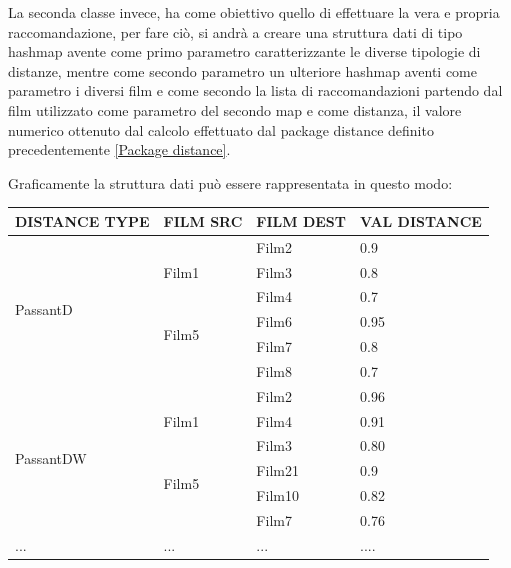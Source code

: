 La seconda classe invece, ha come obiettivo quello di effettuare la vera e propria raccomandazione, per fare ciò, si andrà a creare una struttura dati di tipo hashmap avente come primo parametro caratterizzante le diverse tipologie di distanze, mentre come secondo parametro un ulteriore hashmap aventi come parametro i diversi film e come secondo la lista di raccomandazioni partendo dal film utilizzato come parametro del secondo map e come distanza, il valore numerico ottenuto dal calcolo effettuato dal package distance definito precedentemente \ref{Package distance}. 

Graficamente la struttura dati può essere rappresentata in questo modo:

\begin{table}[H]
	\begin{tabular}{l | l | l | l }
	\textbf{DISTANCE TYPE} & \textbf{FILM SRC} & \textbf{FILM DEST} & \textbf{VAL DISTANCE} \\
	\toprule
		\multirow{6}{*}{PassantD} & \multirow{3}{*}{Film1} & Film2 & 0.9 \\
		&  & Film3 & 0.8 \\
		&  & Film4 & 0.7 \\ \cline{2-4}
		& \multirow{2}{*}{Film5} & Film6 & 0.95 \\ 
		& & Film7 & 0.8 \\
		& & Film8 & 0.7 \\ \bottomrule
		\multirow{6}{*}{PassantDW} & \multirow{3}{*}{Film1} & Film2 & 0.96 \\
		&  & Film4 & 0.91 \\ 
		&  & Film3 & 0.80 \\ \cline{2-4}
		& \multirow{2}{*}{Film5} & Film21 & 0.9 \\ 
		& & Film10 & 0.82 \\
		& & Film7 & 0.76 \\ \bottomrule
		... & ... & ... & ....
	\end{tabular}
\end{table}


